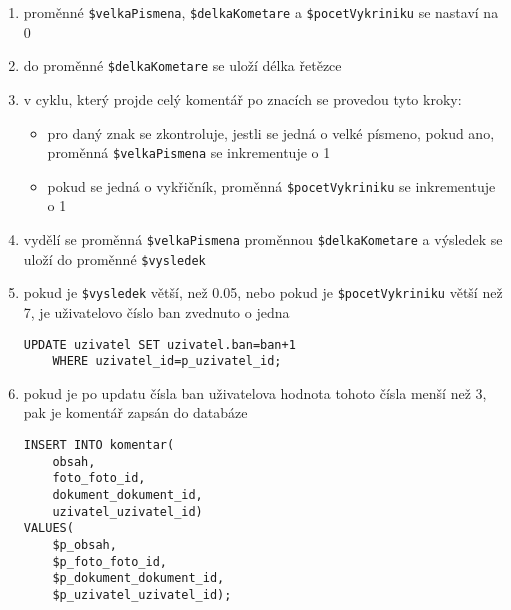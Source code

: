 \documentclass[12pt]{article}
\begin{document}
\begin{enumerate}
\begin{enumerate}[label*=\arabic*.]
\begin{enumerate}[label*=\arabic*.]
				\begin{enumerate}[label=\arabic*)]
					\item proměnné \verb|$velkaPismena|, \verb|$delkaKometare| a \verb|$pocetVykriniku| se nastaví na 0
					\item do proměnné \verb|$delkaKometare| se uloží délka řetězce 
					\item v cyklu, který projde celý komentář po znacích se provedou tyto kroky: 
					\begin{itemize}
						\item pro daný znak se zkontroluje, jestli se jedná o velké písmeno, pokud ano, proměnná \verb|$velkaPismena| se inkrementuje o 1
						\item pokud se jedná o vykřičník, proměnná \verb|$pocetVykriniku| se inkrementuje o 1 
					\end{itemize}
					\item vydělí se proměnná \verb|$velkaPismena| proměnnou \verb|$delkaKometare| a výsledek se uloží do proměnné \verb|$vysledek|
					\item pokud je \verb|$vysledek| větší, než 0.05, nebo pokud je \verb|$pocetVykriniku| větší než 7, je uživatelovo číslo ban zvednuto o jedna
					\begin{lstlisting}
UPDATE uzivatel SET uzivatel.ban=ban+1 
	WHERE uzivatel_id=p_uzivatel_id;
					\end{lstlisting}
					\item pokud je po updatu čísla ban uživatelova hodnota tohoto čísla menší než 3, pak je komentář zapsán do databáze 
					\begin{lstlisting}
INSERT INTO komentar(
	obsah, 
	foto_foto_id, 
	dokument_dokument_id, 
	uzivatel_uzivatel_id) 
VALUES(
	$p_obsah, 
	$p_foto_foto_id, 
	$p_dokument_dokument_id, 
	$p_uzivatel_uzivatel_id);
					\end{lstlisting}


\end{enumerate}
\end{enumerate}
\end{enumerate}
\end{enumerate}
\end{document}
